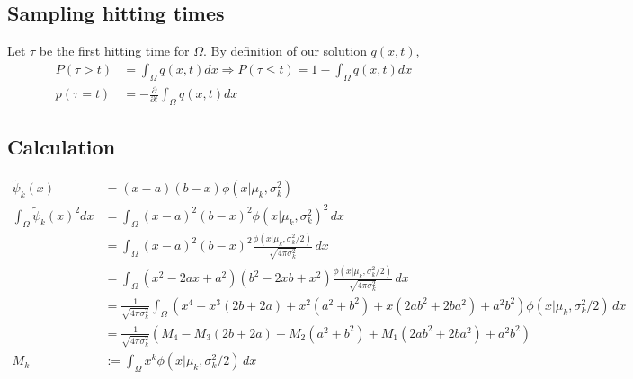 \documentclass[10pt]{article}
\begin{document}
\subsection{Sampling hitting times}
Let $\tau$ be the first hitting time for $\Omega$. By definition of our solution $q(x,t)$,
\begin{align*}
  P(\tau > t) &= \int_\Omega q(x,t) dx \Rightarrow P(\tau \leq t) = 1 - \int_\Omega q(x,t) dx \\
  p(\tau = t) &= -\frac{\partial}{\partial t}\int_\Omega q(x,t) dx
\end{align*}

\begin{appendices}
  \section{Calculation}
  \begin{align*}
    \tilde{\psi}_k(x) &= (x-a)(b-x)\phi(x|\mu_k, \sigma_k^2) \\
    \displaystyle
    \int_\Omega \tilde{\psi}_k(x)^2 dx &= \displaystyle
                                         \int_\Omega (x-a)^2(b-x)^2
                                         \phi(x|\mu_k, \sigma_k^2)^2 \,dx \\
                      &= \displaystyle
                        \int_\Omega (x-a)^2(b-x)^2
                        \frac{\phi(x|\mu_k, \sigma_k^2/2)}{\sqrt{4\pi \sigma_k^2}}
                        \,dx\\
                      &= \displaystyle
                        \int_\Omega (x^2-2ax+a^2)(b^2 - 2xb + x^2)
                        \frac{\phi(x|\mu_k, \sigma_k^2/2)}{\sqrt{4\pi \sigma_k^2}}
                        \,dx\\
                      &= \frac{1}{\sqrt{4\pi \sigma_k^2}} \displaystyle \int_\Omega
                        (x^4 - x^3(2b+2a) + x^2(a^2+b^2) + x(2ab^2 + 2ba^2) + a^2b^2)
                        \phi(x|\mu_k, \sigma_k^2/2)\,dx \\
                      &= \frac{1}{\sqrt{4\pi \sigma_k^2}}\left(
                        M_4 - M_3(2b+2a) + M_2(a^2+b^2) + M_1(2ab^2 + 2ba^2) + a^2b^2
                        \right) \\
    M_k &:= \displaystyle \int_\Omega x^k \phi(x | \mu_k , \sigma^2_k/2)\,dx
  \end{align*}
\end{appendices}



% 

\end{document}

